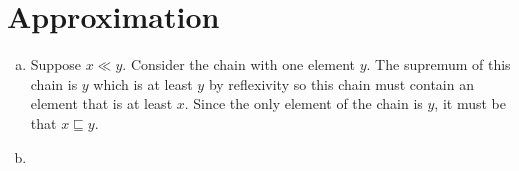 \section{Approximation}
\begin{enumerate}[(a)]
\item Suppose $x \ll y$. Consider the chain with one element $y$. The supremum of this chain is $y$ which is at least $y$ by reflexivity so this chain must contain an element that is at least $x$. Since the only element of the chain is $y$, it must be that $x \sqsubseteq y$.
\item
\end{enumerate}